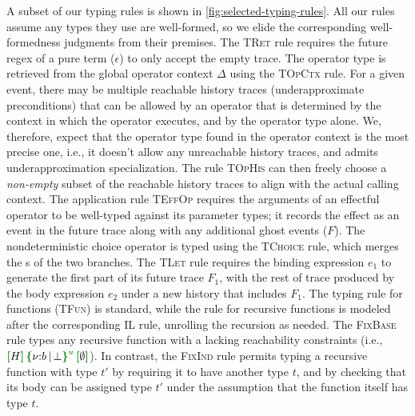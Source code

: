 A subset of our typing rules is shown in
\autoref{fig:selected-typing-rules}. All our
rules assume any types they use are well-formed, so we elide the
corresponding well-formedness judgments from their premises.  The
\textsc{TRet} rule requires the future regex of a pure term
($\epsilon$) to only accept the empty trace.  The operator type is
retrieved from the global operator context $\Delta$ using the
\textsc{TOpCtx} rule.  For a given event, there may be multiple
reachable history traces (underapproximate preconditions) that can be
allowed by an operator that is determined by the context in which the
operator executes, and by the operator type alone.  We, therefore,
expect that the operator type found in the operator context is the
most precise one, i.e., it doesn't allow any unreachable history
traces, and admits underapproximation specialization.  The rule
\textsc{TOpHis} can then freely choose a \emph{non-empty} subset of the reachable
history traces to align with the actual calling context.  The
application rule \textsc{TEffOp} requires the arguments of an
effectful operator to be well-typed against its parameter types; it
records the effect as an event in the future trace along with any
additional ghost events ($F$).  The nondeterministic choice operator
is typed using the \textsc{TChoice} rule, which merges the \tyName{}s
of the two branches.  The \textsc{TLet} rule requires the binding
expression $e_1$ to generate the first part of its future trace $F_1$,
with the rest of trace produced by the body expression $e_2$ under a
new history that includes $F_1$.  The typing rule for functions
(\textsc{TFun}) is standard, while the rule for recursive functions is
modeled after the corresponding IL rule, unrolling the recursion as
needed.  The \textsc{FixBase} rule types any recursive function with a
\tyName{} lacking reachability constraints (i.e.,
$\uhat{H}{\urt{b}{\bot}}{\emptyset}$). In contrast, the
\textsc{FixInd} rule permits typing a recursive function with type
$t'$ by requiring it to have another type $t$, and by checking that
its body can be assigned type $t'$ under the assumption that the
function itself has type $t$.


